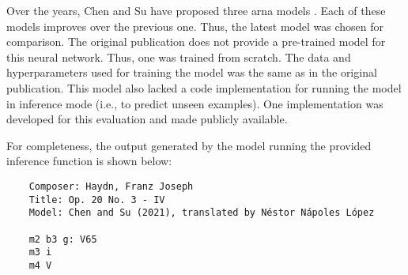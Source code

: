 
Over the years, Chen and Su have proposed three \gls{arna}
models \parencite{chen2018functional, chen2019harmony,
chen2021attend}. Each of these models improves over the
previous one. Thus, the latest model
\parencite{chen2021attend} was chosen for comparison. The
original publication does not provide a pre-trained model
for this neural network. Thus, one was trained from scratch.
The data and hyperparameters used for training the model was
the same as in the original publication. This model also
lacked a code implementation for running the model in
inference mode (i.e., to predict unseen examples). One
implementation was developed for this evaluation and made
publicly
available.

For completeness, the output generated by the model running the provided inference function is shown below:

\begin{verbatim}
    Composer: Haydn, Franz Joseph
    Title: Op. 20 No. 3 - IV
    Model: Chen and Su (2021), translated by Néstor Nápoles López

    m2 b3 g: V65
    m3 i
    m4 V
\end{verbatim}
